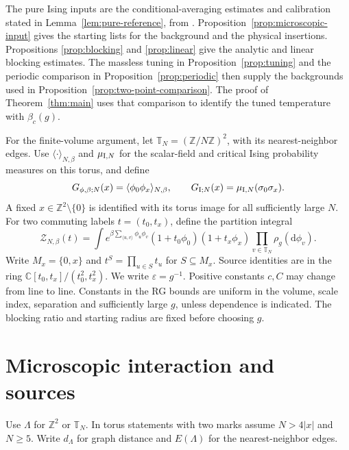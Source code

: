 \documentclass[11pt]{article}
\theoremstyle{definition}
\begin{document}
The pure Ising inputs are the conditional-averaging estimates and
calibration stated in Lemma~\ref{lem:pure-reference}, from
\cite[Proposition 4.1 and Lemma 5.3]{BulkIsingRadialRG}.
Proposition~\ref{prop:microscopic-input} gives the starting lists for
the background and the physical insertions. Propositions
\ref{prop:blocking} and \ref{prop:linear} give the analytic and linear
blocking estimates. The massless tuning in Proposition~\ref{prop:tuning}
and the periodic comparison in Proposition~\ref{prop:periodic} then
supply the backgrounds used in Proposition~\ref{prop:two-point-comparison}.
The proof of Theorem~\ref{thm:main} uses that comparison to identify the
tuned temperature with \(\beta_c(g)\).

For the finite-volume argument, let \(\mathbb T_N=(\mathbb Z/N\mathbb Z)^2\),
with its nearest-neighbor edges. Use \(\langle\cdot\rangle_{N,\beta}\)
and \(\mu_{{\rm I},N}\) for the scalar-field and critical Ising
probability measures on this torus, and define
\[
 G_{\phi,\beta;N}(x)=\langle\phi_0\phi_x\rangle_{N,\beta},
 \qquad G_{{\rm I};N}(x)=\mu_{{\rm I},N}(\sigma_0\sigma_x).
\]
A fixed \(x\in\mathbb Z^2\setminus\{0\}\) is identified with its torus
image for all sufficiently large \(N\). For two commuting labels
\(t=(t_0,t_x)\), define the partition integral
\[
 \mathcal Z_{N,\beta}(t)=
 \int e^{\beta\sum_{\langle u,v\rangle}\phi_u\phi_v}
 (1+t_0\phi_0)(1+t_x\phi_x)
 \prod_{v\in\mathbb T_N}\rho_g(\mathrm d\phi_v).
\]
Write \(M_x=\{0,x\}\) and \(t^S=\prod_{u\in S}t_u\) for \(S\subseteq M_x\).
Source identities are in the ring
\(\mathbb C[t_0,t_x]/(t_0^2,t_x^2)\).
We write \(\varepsilon=g^{-1}\).
Positive constants \(c,C\) may change from line to line.
Constants in the RG bounds are uniform in the volume, scale index,
separation and sufficiently large \(g\), unless dependence is indicated.
The blocking ratio and starting radius are fixed before choosing \(g\).

\section{Microscopic interaction and sources}
\label{sec:amplitudes}

Use \(\Lambda\) for \(\mathbb Z^2\) or \(\mathbb T_N\). In torus
statements with two marks assume \(N>4|x|\) and \(N\ge5\).
Write \(d_\Lambda\) for graph distance and \(E(\Lambda)\) for the
nearest-neighbor edges.
\end{document}
